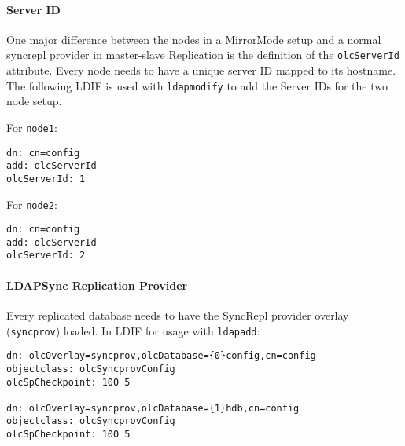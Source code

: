 \documentclass[a4paper,11pt,DIV=12]{scrartcl}
\begin{document}
\paragraph{Server ID}
    One major difference between the nodes in a MirrorMode setup and a normal
    syncrepl provider in master-slave Replication is the definition of the
    \verb|olcServerId| attribute. Every node needs to have a unique
    server ID mapped to its hostname. The following LDIF is used with
    \verb|ldapmodify| to add the Server IDs for the two node setup.

    For \verb|node1|:
    \begin{verbatim}
dn: cn=config
add: olcServerId
olcServerId: 1
    \end{verbatim}

    For \verb|node2|:
    \begin{verbatim}
dn: cn=config
add: olcServerId
olcServerId: 2
    \end{verbatim}

\paragraph{LDAPSync Replication Provider}
    Every replicated database needs to have the SyncRepl provider overlay
    (\verb|syncprov|) loaded. In LDIF for usage with \verb|ldapadd|:

    \begin{verbatim}
dn: olcOverlay=syncprov,olcDatabase={0}config,cn=config
objectclass: olcSyncprovConfig
olcSpCheckpoint: 100 5

dn: olcOverlay=syncprov,olcDatabase={1}hdb,cn=config
objectclass: olcSyncprovConfig
olcSpCheckpoint: 100 5
    \end{verbatim}
\end{document}
